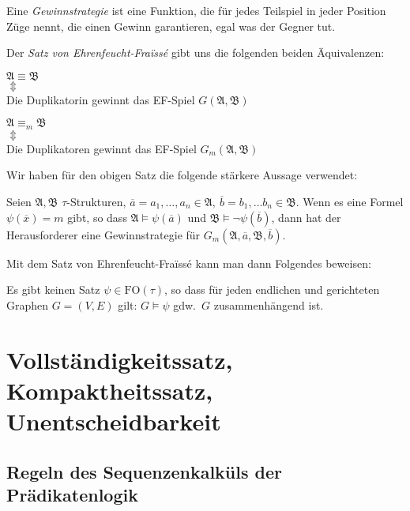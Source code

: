 \documentclass[a4paper,parskip=half*,DIV=15,fontsize=11pt]{scrartcl}
\newcommand{\A}{\mathfrak{A}}
\newcommand{\B}{\mathfrak{B}}
\newcommand{\FO}{\mathrm{FO}}
\begin{document}
Eine \emph{Gewinnstrategie} ist eine Funktion, die für jedes Teilspiel in jeder Position Züge nennt, die einen Gewinn garantieren, egal was der Gegner tut.

Der \emph{Satz von Ehrenfeucht-Fra\"issé} gibt uns die folgenden beiden Äquivalenzen:

\begin{center}
\begin{minipage}{0.3\textwidth}
\centering
$\A \equiv \B$ \\
$\Updownarrow$ \\
Die Duplikatorin gewinnt das EF-Spiel $G(\A, \B)$
\end{minipage}\hspace{0.1\textwidth}
\begin{minipage}{0.3\textwidth}
\centering
$\A \equiv_m \B$ \\
$\Updownarrow$ \\
Die Duplikatoren gewinnt das EF-Spiel $G_m(\A, \B)$
\end{minipage}
\end{center}

Wir haben für den obigen Satz die folgende stärkere Aussage verwendet:

Seien $\A, \B$ $\tau$-Strukturen, $\overline{a} = a_1, \ldots, a_n \in \A,\ \overline{b} = b_1, \ldots b_n \in \B$. Wenn es eine Formel $\psi(\overline{x}) = m$ gibt, so dass $\A \models \psi(\overline{a})$ und $\B \models \neg \psi(\overline{b})$, dann hat der Herausforderer eine Gewinnstrategie für $G_m(\A, \overline{a}, \B, \overline{b})$.

Mit dem Satz von Ehrenfeucht-Fra\"issé kann man dann Folgendes beweisen:

Es gibt keinen Satz $\psi \in \FO(\tau)$, so dass für jeden endlichen und gerichteten Graphen $G = (V, E)$ gilt: $G \models \psi$ gdw.\ $G$ zusammenhängend ist.

\section{Vollständigkeitssatz, Kompaktheitssatz, Unentscheidbarkeit}

\subsection{Regeln des Sequenzenkalküls der Prädikatenlogik}
\end{document}
